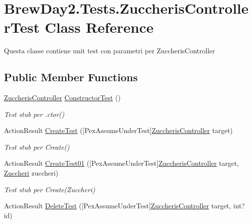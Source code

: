 \hypertarget{class_brew_day2_1_1_tests_1_1_zuccheris_controller_test}{}\section{Brew\+Day2.\+Tests.\+Zuccheris\+Controller\+Test Class Reference}
\label{class_brew_day2_1_1_tests_1_1_zuccheris_controller_test}


Questa classe contiene unit test con parametri per Zuccheris\+Controller 


\subsection*{Public Member Functions}
\begin{DoxyCompactItemize}
\item 
\mbox{\hyperlink{class_brew_day2_1_1_controllers_1_1_zuccheris_controller}{Zuccheris\+Controller}} \mbox{\hyperlink{class_brew_day2_1_1_tests_1_1_zuccheris_controller_test_af36c5e8da8a2a820c5bb9631cf0154c9}{Constructor\+Test}} ()
\begin{DoxyCompactList}\small\item\em Test stub per .ctor()\end{DoxyCompactList}\item 
Action\+Result \mbox{\hyperlink{class_brew_day2_1_1_tests_1_1_zuccheris_controller_test_a974f1c86334ca081abd0105a621b32bf}{Create\+Test}} (\mbox{[}Pex\+Assume\+Under\+Test\mbox{]}\mbox{\hyperlink{class_brew_day2_1_1_controllers_1_1_zuccheris_controller}{Zuccheris\+Controller}} target)
\begin{DoxyCompactList}\small\item\em Test stub per Create()\end{DoxyCompactList}\item 
Action\+Result \mbox{\hyperlink{class_brew_day2_1_1_tests_1_1_zuccheris_controller_test_a205ddbbeafefb52633a7118f1328b398}{Create\+Test01}} (\mbox{[}Pex\+Assume\+Under\+Test\mbox{]}\mbox{\hyperlink{class_brew_day2_1_1_controllers_1_1_zuccheris_controller}{Zuccheris\+Controller}} target, \mbox{\hyperlink{class_brew_day2_1_1_models_1_1_zuccheri}{Zuccheri}} zuccheri)
\begin{DoxyCompactList}\small\item\em Test stub per Create(\+Zuccheri)\end{DoxyCompactList}\item 
Action\+Result \mbox{\hyperlink{class_brew_day2_1_1_tests_1_1_zuccheris_controller_test_aecb3a1cf7933523f72b9787e03f28c5b}{Delete\+Test}} (\mbox{[}Pex\+Assume\+Under\+Test\mbox{]}\mbox{\hyperlink{class_brew_day2_1_1_controllers_1_1_zuccheris_controller}{Zuccheris\+Controller}} target, int? id)

\end{DoxyCompactItemize}
